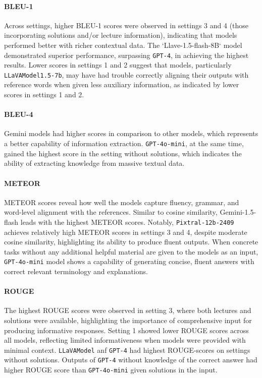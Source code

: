 \documentclass{article}
\begin{document}
\paragraph{BLEU-1}
Across settings, higher BLEU-1 scores were observed in settings 3 and 4 (those incorporating solutions and/or lecture information), indicating that models performed better with richer contextual data. The `Llave-1.5-flash-8B` model demonstrated superior performance, surpassing \texttt{GPT-4}, in achieving the highest results. Lower scores in settings 1 and 2 suggest that models, particularly \texttt{LLaVAModel1.5-7b}, may have had trouble correctly aligning their outputs with reference words when given less auxiliary information, as indicated by lower scores in settings 1 and 2. 

\paragraph{BLEU-4}
Gemini models had higher scores in comparison to other models, which represents a better capability of information extraction. \texttt{GPT-4o-mini}, at the same time, gained the highest score in the setting without solutions, which indicates the ability of extracting knowledge from massive textual data.

\paragraph{METEOR}
METEOR scores reveal how well the models capture fluency, grammar, and word-level alignment with the references. Similar to cosine similarity, {Gemini-1.5-flash} leads with the highest METEOR scores. Notably, \texttt{Pixtral-12b-2409} achieves relatively high METEOR scores in settings 3 and 4, despite moderate cosine similarity, highlighting its ability to produce fluent outputs. When concrete tasks without any additional helpful material are given to the models as an input, \texttt{GPT-4o-mini} model shows a capability of generating concise, fluent answers with correct relevant terminology and explanations.

\paragraph{ROUGE}
The highest ROUGE scores were observed in setting 3, where both lectures and solutions were available, highlighting the importance of comprehensive input for producing informative responses. Setting 1 showed lower ROUGE scores across all models, reflecting limited informativeness when models were provided with minimal context.  \texttt{LLaVAModel} anf \texttt{GPT-4} had highest ROUGE-scores on settings without solutions. Outputs of \texttt{GPT-4} without knowledge of the correct answer had higher ROUGE score than \texttt{GPT-4o-mini} given solutions in the input.
\end{document}
